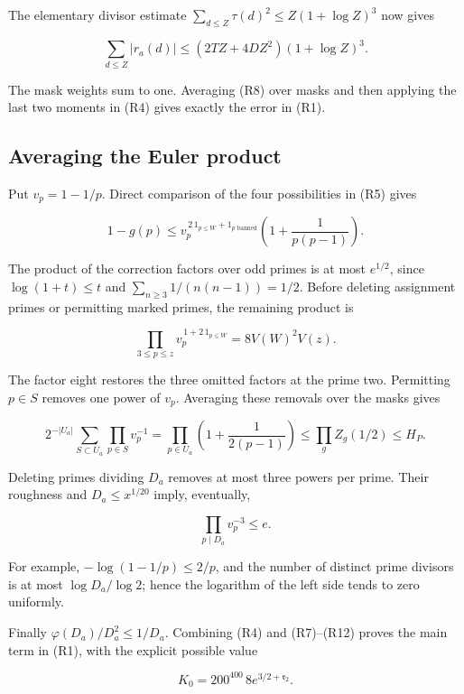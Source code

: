 The elementary divisor estimate
\(\sum_{d\le Z}\tau(d)^2\le Z(1+\log Z)^3\) now gives

\[
\sum_{d\le Z}|r_a(d)|
 \le(2TZ+4DZ^2)(1+\log Z)^3. \tag{R8}
\]

The mask weights sum to one. Averaging (R8) over masks and then applying
the last two moments in (R4) gives exactly the error in (R1).


\hypertarget{rectangles-averaging-the-euler-product}{%
\subsection{Averaging the Euler
product}\label{rectangles-averaging-the-euler-product}}

Put \(v_p=1-1/p\). Direct comparison of the four possibilities in (R5)
gives

\[
1-g(p)\le
v_p^{\,2\,1_{p\le W}+1_{p\text{ banned}}}
\left(1+\frac1{p(p-1)}\right). \tag{R9}
\]

The product of the correction factors over odd primes is at most
\(e^{1/2}\), since \(\log(1+t)\le t\) and
\(\sum_{n\ge3}1/(n(n-1))=1/2\). Before deleting assignment primes or
permitting marked primes, the remaining product is

\[
\prod_{3\le p\le z}v_p^{\,1+2\,1_{p\le W}}
=8V(W)^2V(z). \tag{R10}
\]

The factor eight restores the three omitted factors at the prime two.
Permitting \(p\in S\) removes one power of \(v_p\). Averaging these
removals over the masks gives

\[
2^{-|U_a|}\sum_{S\subset U_a}\prod_{p\in S}v_p^{-1}
=\prod_{p\in U_a}\left(1+\frac1{2(p-1)}\right)
\le\prod_gZ_g(1/2)\le H_P. \tag{R11}
\]

Deleting primes dividing \(D_a\) removes at most three powers per prime.
Their roughness and \(D_a\le x^{1/20}\) imply, eventually,

\[
\prod_{p\mid D_a}v_p^{-3}\le e. \tag{R12}
\]

For example, \(-\log(1-1/p)\le2/p\), and the number of distinct prime
divisors is at most \(\log D_a/\log2\); hence the logarithm of the left
side tends to zero uniformly.

Finally \(\varphi(D_a)/D_a^2\le1/D_a\). Combining (R4) and (R7)--(R12)
proves the main term in (R1), with the explicit possible value

\[
K_0=200^{400}\,8e^{3/2+\mathfrak r_2}.
\]


